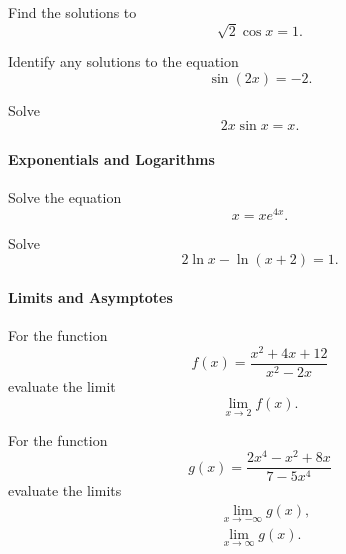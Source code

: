 \begin{problem}
Find the solutions to 
\begin{equation*}
\sqrt{2}\cos x =1.
\end{equation*}
\end{problem}

\begin{problem}
Identify any solutions to the equation
\begin{equation*}
\sin(2x)=-2.
\end{equation*}
\end{problem}

\begin{problem}[$\star$]
Solve
\begin{equation*}
2x\sin x = x.
\end{equation*}
\end{problem}

\paragraph{Exponentials and Logarithms}
\begin{problem}[$\star$]
Solve the equation
\begin{equation*}
x=xe^{4x}.
\end{equation*}
\end{problem}

\begin{problem}[$\star$]
Solve
\begin{equation*}
2\ln x -\ln(x+2)=1.
\end{equation*}
\end{problem}

\paragraph{Limits and Asymptotes}
\begin{problem}[$\star$]
For the function
\begin{equation*}
f(x)=\frac{x^{2}+4x+12}{x^{2}-2x}
\end{equation*}
evaluate the limit
\begin{equation*}
\lim_{x\to 2}f(x).
\end{equation*}
\end{problem}

\begin{problem}[$\star$]
For the function
\begin{equation*}
g(x)=\frac{2x^{4}-x^{2}+8x}{7-5x^{4}}
\end{equation*}
evaluate the limits
\begin{align*}
&\lim_{x\to -\infty}g(x),\\
&\lim_{x\to \infty}g(x).
\end{align*}
\end{problem}


